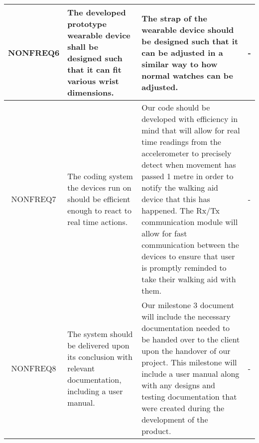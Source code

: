 \begin{xltabular}[H]{\textwidth}{c | X | X | X}
        NONFREQ6

        &

        The developed prototype wearable device shall be designed such that it can fit various wrist dimensions.

        &

        The strap of the wearable device should be designed such that it can be adjusted in a similar way to how normal watches can be adjusted.

        &

        -\\

		\midrule

        NONFREQ7

        &

        The coding system the devices run on should be efficient enough to react to real time actions.

        &

        Our code should be developed with efficiency in mind that will allow for real time readings from the accelerometer to precisely detect when movement has passed 1 metre in order to notify the walking aid device that this has happened. The Rx/Tx communication module will allow for fast communication between the devices to ensure that user is promptly reminded to take their walking aid with them.

        &

        -\\

		\midrule

        NONFREQ8

        &

        The system should be delivered upon its conclusion with relevant documentation, including a user manual.

        &

        Our milestone 3 document will include the necessary documentation needed to be handed over to the client upon the handover of our project. This milestone will include a user manual along with any designs and testing documentation that were created during the development of the product.

        &

        -\\

	\end{xltabular}
	\label{tbl:non_func_reqs_table}
